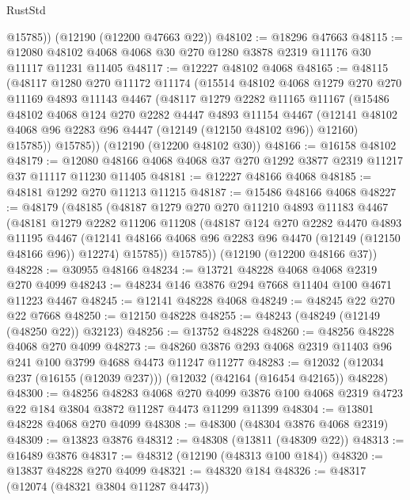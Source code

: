 \begin{lexlean}{RustStd}
\begin{coremodule}
        @15785))
    (@12190 (@12200 @47663 @22))
@48102 := @18296 @47663
@48115 := @12080 @48102 @4068 @4068 @30 @270 @1280 @3878 @2319 @11176 @30 @11117 @11231 @11405
@48117 := @12227 @48102 @4068
@48165 := @48115
    (@48117
      @1280
      @270
      @11172
      @11174
      (@15514
        @48102
        @4068
        @1279
        @270
        @270
        @11169
        @4893
        @11143
        @4467
        (@48117
          @1279
          @2282
          @11165
          @11167
          (@15486
            @48102
            @4068
            @124
            @270
            @2282
            @4447
            @4893
            @11154
            @4467
            (@12141 @48102 @4068 @96 @2283 @96 @4447 (@12149 (@12150 @48102 @96)) @12160)
            @15785))
        @15785))
    (@12190 (@12200 @48102 @30))
@48166 := @16158 @48102
@48179 := @12080 @48166 @4068 @4068 @37 @270 @1292 @3877 @2319 @11217 @37 @11117 @11230 @11405
@48181 := @12227 @48166 @4068
@48185 := @48181 @1292 @270 @11213 @11215
@48187 := @15486 @48166 @4068
@48227 := @48179
    (@48185
      (@48187
        @1279
        @270
        @270
        @11210
        @4893
        @11183
        @4467
        (@48181
          @1279
          @2282
          @11206
          @11208
          (@48187
            @124
            @270
            @2282
            @4470
            @4893
            @11195
            @4467
            (@12141 @48166 @4068 @96 @2283 @96 @4470 (@12149 (@12150 @48166 @96)) @12274)
            @15785))
        @15785))
    (@12190 (@12200 @48166 @37))
@48228 := @30955 @48166
@48234 := @13721 @48228 @4068 @4068 @2319 @270 @4099
@48243 := @48234 @146 @3876 @294 @7668 @11404 @100 @4671 @11223 @4467
@48245 := @12141 @48228 @4068
@48249 := @48245 @22 @270 @22 @7668
@48250 := @12150 @48228
@48255 := @48243 (@48249 (@12149 (@48250 @22)) @32123)
@48256 := @13752 @48228
@48260 := @48256 @48228 @4068 @270 @4099
@48273 := @48260 @3876 @293 @4068 @2319 @11403 @96 @241 @100 @3799 @4688 @4473 @11247 @11277
@48283 := @12032 (@12034 @237 (@16155 (@12039 @237))) (@12032 (@42164 (@16454 @42165)) @48228)
@48300 := @48256
    @48283
    @4068
    @270
    @4099
    @3876
    @100
    @4068
    @2319
    @4723
    @22
    @184
    @3804
    @3872
    @11287
    @4473
    @11299
    @11399
@48304 := @13801 @48228 @4068 @270 @4099
@48308 := @48300 (@48304 @3876 @4068 @2319)
@48309 := @13823 @3876
@48312 := @48308 (@13811 (@48309 @22))
@48313 := @16489 @3876
@48317 := @48312 (@12190 (@48313 @100 @184))
@48320 := @13837 @48228 @270 @4099
@48321 := @48320 @184
@48326 := @48317 (@12074 (@48321 @3804 @11287 @4473))

\end{coremodule}
\end{lexlean}
